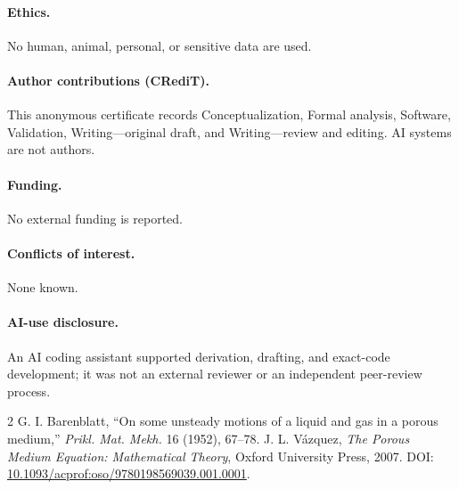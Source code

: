 \documentclass[9pt]{extarticle}
\begin{document}
\paragraph{Ethics.} No human, animal, personal, or sensitive data are used.
\paragraph{Author contributions (CRediT).} This anonymous certificate records
Conceptualization, Formal analysis, Software, Validation, Writing---original
draft, and Writing---review and editing. AI systems are not authors.
\paragraph{Funding.} No external funding is reported.
\paragraph{Conflicts of interest.} None known.
\paragraph{AI-use disclosure.} An AI coding assistant supported derivation,
drafting, and exact-code development; it was not an external reviewer or an
independent peer-review process.

\begin{thebibliography}{2}
 G. I. Barenblatt,
``On some unsteady motions of a liquid and gas in a porous medium,''
\emph{Prikl. Mat. Mekh.} 16 (1952), 67--78.
 J. L. V\'azquez,
\emph{The Porous Medium Equation: Mathematical Theory}, Oxford University
Press, 2007. DOI: \url{10.1093/acprof:oso/9780198569039.001.0001}.
\end{thebibliography}
\end{document}
